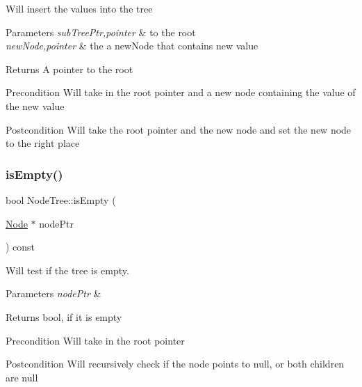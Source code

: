 Will insert the values into the tree 
\begin{DoxyParams}{Parameters}
{\em sub\+Tree\+Ptr,pointer} & to the root \\
\hline
{\em new\+Node,pointer} & the a new\+Node that contains new value \\
\hline
\end{DoxyParams}
\begin{DoxyReturn}{Returns}
A pointer to the root 
\end{DoxyReturn}
\begin{DoxyPrecond}{Precondition}
Will take in the root pointer and a new node containing the value of the new value 
\end{DoxyPrecond}
\begin{DoxyPostcond}{Postcondition}
Will take the root pointer and the new node and set the new node to the right place 
\end{DoxyPostcond}
\mbox{\label{class_node_tree_a484735008677b458037b1ce114d12f1a}} 
\subsubsection{\texorpdfstring{is\+Empty()}{isEmpty()}}
{\footnotesize\ttfamily bool Node\+Tree\+::is\+Empty (\begin{DoxyParamCaption}\item[{\mbox{\hyperlink{class_node}{Node}} $\ast$}]{node\+Ptr }\end{DoxyParamCaption}) const}



Will test if the tree is empty. 


\begin{DoxyParams}{Parameters}
{\em node\+Ptr} & \\
\hline
\end{DoxyParams}
\begin{DoxyReturn}{Returns}
bool, if it is empty 
\end{DoxyReturn}
\begin{DoxyPrecond}{Precondition}
Will take in the root pointer 
\end{DoxyPrecond}
\begin{DoxyPostcond}{Postcondition}
Will recursively check if the node points to null, or both children are null 
\end{DoxyPostcond}
\mbox{\label{class_node_tree_a71a5469b3871672b409224ee905540c3}} 
